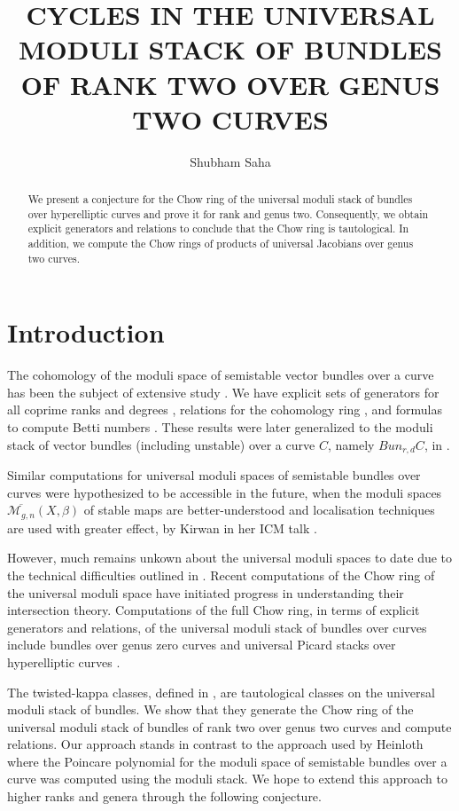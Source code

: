 \documentclass[11pt]{amsart}
\title{\MakeUppercase{Cycles in the universal moduli stack of bundles of rank two over genus two curves} }
\author{Shubham Saha}
\numberwithin{theorem}{section}
\numberwithin{lemma}{section}
\theoremstyle{definition}
\begin{document}
	\begin{abstract}
We present a conjecture for the Chow ring of the universal moduli stack of bundles over hyperelliptic curves and prove it for rank and genus two. 
Consequently, we obtain explicit generators and relations to conclude that the Chow ring is tautological.
In addition, we compute the Chow rings of products of universal Jacobians over genus two curves.
	\end{abstract}
	\maketitle
	\vspace{-1em}
\section*{Introduction}\label{intro}
The cohomology of the moduli space of semistable vector bundles over a curve has been the subject of extensive study \cite{ kirwan,zagier,king-newstead, kirwan-earl}. 
We have explicit sets of generators for all coprime ranks and degrees \cite{atiyah-bott}, relations for the cohomology ring \cite{kirwan-earl}, and formulas to compute Betti numbers \cite{del-bano}.
These results were later generalized to the moduli stack of vector bundles (including unstable) over a curve $C$, namely $Bun_{r,d}C$, in \cite{heinloth}.

Similar computations for universal moduli spaces of semistable bundles over curves were hypothesized to be accessible in the future,
 when the moduli spaces $\overline{\mathcal{M}_{g,n}}(X,\beta)$ of stable maps are better-understood and localisation techniques are used with greater effect, 
 by Kirwan in her ICM talk \cite[\S 8]{kirwan-talk}. 
 
However, much remains unkown about the universal moduli spaces to date due to the technical difficulties outlined in \cite{kirwan-talk}.
Recent computations of the Chow ring of the universal moduli space \cite{larson-18,larson-24,shubham-r2} have initiated progress in understanding their intersection theory.
Computations of the full Chow ring, in terms of explicit generators and relations, of the universal moduli stack of bundles over curves include bundles over genus zero curves \cite{larson-18} and universal Picard stacks over hyperelliptic curves \cite{larson-24}. 

The twisted-kappa classes, defined in \cite{larson-24, shubham-r2}, are tautological classes on the universal moduli stack of bundles. We show that they generate the Chow ring of the universal moduli stack of bundles of rank two over genus two curves and compute relations.
Our approach stands in contrast to the approach used by Heinloth \cite[\S 5]{heinloth} where the Poincare polynomial for the moduli space of semistable bundles over a curve was computed using the moduli stack.
We hope to extend this approach to higher ranks and genera through the following conjecture.
\end{document}
